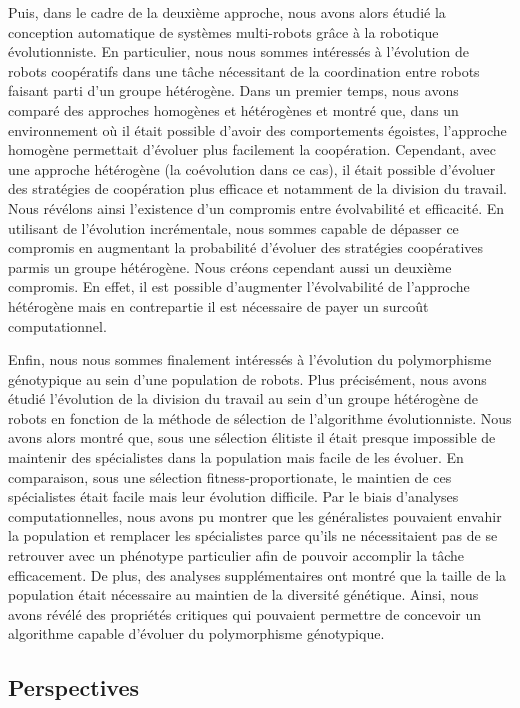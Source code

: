 		Puis, dans le cadre de la deuxième approche, nous avons alors étudié la conception automatique de systèmes multi-robots grâce à la robotique évolutionniste. En particulier, nous nous sommes intéressés à l'évolution de robots coopératifs dans une tâche nécessitant de la coordination entre robots faisant parti d'un groupe hétérogène. Dans un premier temps, nous avons comparé des approches homogènes et hétérogènes et montré que, dans un environnement où il était possible d'avoir des comportements égoistes, l'approche homogène permettait d'évoluer plus facilement la coopération. Cependant, avec une approche hétérogène (la coévolution dans ce cas), il était possible d'évoluer des stratégies de coopération plus efficace et notamment de la division du travail. Nous révélons ainsi l'existence d'un compromis entre évolvabilité et efficacité. En utilisant de l'évolution incrémentale, nous sommes capable de dépasser ce compromis en augmentant la probabilité d'évoluer des stratégies coopératives parmis un groupe hétérogène. Nous créons cependant aussi un deuxième compromis. En effet, il est possible d'augmenter l'évolvabilité de l'approche hétérogène mais en contrepartie il est nécessaire de payer un surcoût computationnel.

		Enfin, nous nous sommes finalement intéressés à l'évolution du polymorphisme génotypique au sein d'une population de robots. Plus précisément, nous avons étudié l'évolution de la division du travail au sein d'un groupe hétérogène de robots en fonction de la méthode de sélection de l'algorithme évolutionniste. Nous avons alors montré que, sous une sélection élitiste il était presque impossible de maintenir des spécialistes dans la population mais facile de les évoluer. En comparaison, sous une sélection fitness-proportionate, le maintien de ces spécialistes était facile mais leur évolution difficile. Par le biais d'analyses computationnelles, nous avons pu montrer que les généralistes pouvaient envahir la population et remplacer les spécialistes parce qu'ils ne nécessitaient pas de se retrouver avec un phénotype particulier afin de pouvoir accomplir la tâche efficacement. De plus, des analyses supplémentaires ont montré que la taille de la population était nécessaire au maintien de la diversité génétique. Ainsi, nous avons révélé des propriétés critiques qui pouvaient permettre de concevoir un algorithme capable d'évoluer du polymorphisme génotypique.


	\subsection{Perspectives}


